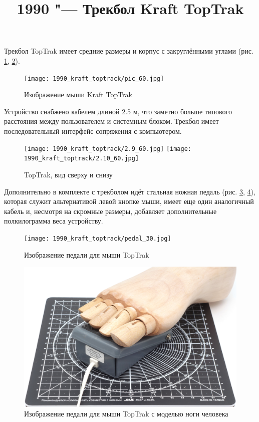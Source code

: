 \documentclass[11pt, a4paper]{article}
\begin{document}
\title{1990 "--- Трекбол Kraft TopTrak}
\date{}
\maketitle
{}
Трекбол TopTrak имеет средние размеры и корпус с закруглёнными углами (рис. \ref{fig:TopTrakPic}, \ref{fig:TopTrakTopAndBottom}).

\begin{figure}[h]
    \centering
    \texttt{[image: 1990\_kraft\_toptrack/pic\_60.jpg]}
    \caption{Изображение мыши Kraft TopTrak}
    \label{fig:TopTrakPic}
\end{figure}

Устройство снабжено кабелем длиной 2.5 м, что заметно больше типового расстояния между пользователем и системным блоком. Трекбол имеет последовательный интерфейс сопряжения с компьютером.

\begin{figure}[h]
    \centering
    \texttt{[image: 1990\_kraft\_toptrack/2.9\_60.jpg]}
    \texttt{[image: 1990\_kraft\_toptrack/2.10\_60.jpg]}
    \caption{TopTrak, вид сверху и снизу}
    \label{fig:TopTrakTopAndBottom}
\end{figure}

Дополнительно в комплекте с трекболом идёт стальная ножная педаль (рис. \ref{fig:TopTrakPedal}, \ref{fig:TopTrakPedalFoot}), которая служит альтернативой левой кнопке мыши, имеет еще один аналогичный кабель и, несмотря на скромные размеры, добавляет дополнительные полкилограмма веса устройству.

\begin{figure}[h]
    \centering
    \texttt{[image: 1990\_kraft\_toptrack/pedal\_30.jpg]}
    \caption{Изображение педали для мыши TopTrak}
    \label{fig:TopTrakPedal}
\end{figure}

\begin{figure}[h]
    \centering
    \includegraphics[scale=0.22]{1990_kraft_toptrack/pedal_foot_30.jpg}
    \caption{Изображение педали для мыши TopTrak с моделью ноги человека}
    \label{fig:TopTrakPedalFoot}
\end{figure}
\end{document}
